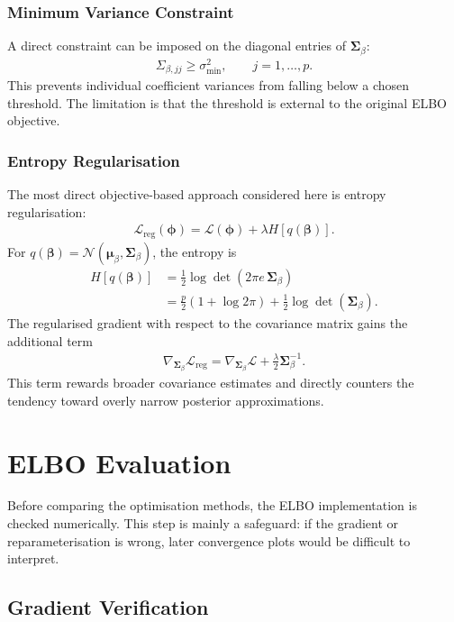 \documentclass[11pt,a4paper]{article}
\newcommand{\N}{\mathcal{N}}
\begin{document}
\subsubsection{Minimum Variance Constraint}

A direct constraint can be imposed on the diagonal entries of $\bm{\Sigma}_\beta$:
\begin{align}
\Sigma_{\beta,jj} \geq \sigma^2_{\min}, \qquad j=1,\ldots,p.
\end{align}
This prevents individual coefficient variances from falling below a chosen threshold. The limitation is that the threshold is external to the original ELBO objective.

\subsubsection{Entropy Regularisation}

The most direct objective-based approach considered here is entropy regularisation:
\begin{align}
\mathcal{L}_{\mathrm{reg}}(\bm{\phi})
= \mathcal{L}(\bm{\phi}) + \lambda H[q(\bm{\beta})].
\end{align}
For $q(\bm{\beta})=\N(\bm{\mu}_\beta,\bm{\Sigma}_\beta)$, the entropy is
\begin{align}
H[q(\bm{\beta})]
&= \frac{1}{2}\log\det(2\pi e\,\bm{\Sigma}_\beta)\\
&= \frac{p}{2}(1+\log 2\pi) + \frac{1}{2}\log\det(\bm{\Sigma}_\beta).
\end{align}
The regularised gradient with respect to the covariance matrix gains the additional term
\begin{align}
\nabla_{\bm{\Sigma}_\beta}\mathcal{L}_{\mathrm{reg}}
= \nabla_{\bm{\Sigma}_\beta}\mathcal{L}
+ \frac{\lambda}{2}\bm{\Sigma}_\beta^{-1}.
\end{align}
This term rewards broader covariance estimates and directly counters the tendency toward overly narrow posterior approximations.
\section{ELBO Evaluation}
\label{sec:elbo-evaluation}

Before comparing the optimisation methods, the ELBO implementation is checked numerically. This step is mainly a safeguard: if the gradient or reparameterisation is wrong, later convergence plots would be difficult to interpret.

\subsection{Gradient Verification}
\end{document}
